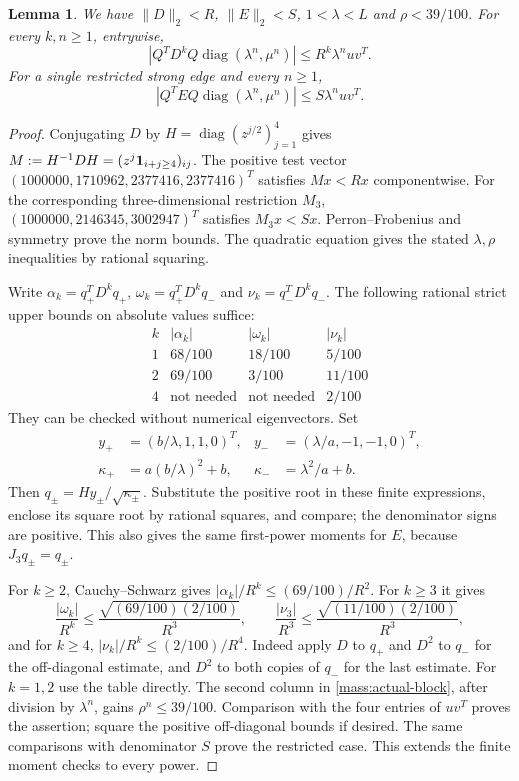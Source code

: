 \documentclass[11pt]{amsart}
\newtheorem{lemma}[theorem]{Lemma}
\theoremstyle{definition}
\theoremstyle{remark}
\numberwithin{equation}{section}
\begin{document}
\begin{lemma}\label{mass:block}
We have $\|D\|_2<R$, $\|E\|_2<S$, $1<\lambda<L$ and
$\rho<39/100$. For every $k,n\ge1$, entrywise,
\begin{equation}\label{mass:actual-block}
 \left|Q^TD^kQ\operatorname{diag}(\lambda^n,\mu^n)\right|
 \le R^k\lambda^nuv^T.
\end{equation}
For a single restricted strong edge and every $n\ge1$,
\[
 \left|Q^TEQ\operatorname{diag}(\lambda^n,\mu^n)\right|
 \le S\lambda^nuv^T.
\]
\end{lemma}

\begin{proof}
Conjugating $D$ by $H=\operatorname{diag}(z^{j/2})_{j=1}^4$ gives
$M:=H^{-1}DH=(z^j{\bf1}_{i+j\ge4})_{ij}$. The positive test vector
$(1000000,1710962,2377416,2377416)^T$ satisfies $Mx<Rx$
componentwise. For the corresponding three-dimensional restriction $M_3$,
$(1000000,2146345,3002947)^T$ satisfies $M_3x<Sx$. Perron--Frobenius
and symmetry prove the norm bounds. The quadratic equation gives the
stated $\lambda,\rho$ inequalities by rational squaring.

Write $\alpha_k=q_+^TD^kq_+$, $\omega_k=q_+^TD^kq_-$ and
$\nu_k=q_-^TD^kq_-$. The following rational strict upper bounds on
absolute values suffice:
\[
\begin{array}{c|ccc}
 k&|\alpha_k|&|\omega_k|&|\nu_k|\\\hline
 1&68/100&18/100&5/100\\
 2&69/100&3/100&11/100\\
 4&\text{not needed}&\text{not needed}&2/100
\end{array}
\]
They can be checked without numerical eigenvectors. Set
\[
\begin{aligned}
 y_+&=(b/\lambda,1,1,0)^T,& y_-&=(\lambda/a,-1,-1,0)^T,\\
 \kappa_+&=a(b/\lambda)^2+b,& \kappa_-&=\lambda^2/a+b.
\end{aligned}
\]
Then $q_\pm=Hy_\pm/\sqrt{\kappa_\pm}$. Substitute the positive root in
these finite expressions, enclose its square root by rational squares,
and compare; the denominator signs are positive. This also gives the
same first-power moments for $E$, because $J_3q_\pm=q_\pm$.

For $k\ge2$, Cauchy--Schwarz gives
$|\alpha_k|/R^k\le(69/100)/R^2$. For $k\ge3$ it gives
\[
 \frac{|\omega_k|}{R^k}\le
 \frac{\sqrt{(69/100)(2/100)}}{R^3},\qquad
 \frac{|\nu_3|}{R^3}\le
 \frac{\sqrt{(11/100)(2/100)}}{R^3},
\]
and for $k\ge4$, $|\nu_k|/R^k\le(2/100)/R^4$.
Indeed apply $D$ to $q_+$ and $D^2$ to $q_-$ for the off-diagonal
estimate, and $D^2$ to both copies of $q_-$ for the last estimate.
For $k=1,2$ use the table directly. The second column in
\eqref{mass:actual-block}, after division by $\lambda^n$, gains
$\rho^n\le39/100$. Comparison with the four entries of $uv^T$ proves
the assertion; square the positive off-diagonal bounds if desired.
The same comparisons with denominator $S$ prove the restricted case.
This extends the finite moment checks to every power.
\end{proof}
\end{document}
